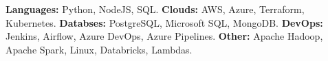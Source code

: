 

\textbf{Languages:} Python, NodeJS, SQL.
\textbf{Clouds:} AWS, Azure, Terraform, Kubernetes.
\textbf{Databses:} PostgreSQL, Microsoft SQL, MongoDB.
\textbf{DevOps:} Jenkins, Airflow, Azure DevOps, Azure Pipelines.
\textbf{Other:} Apache Hadoop, Apache Spark, Linux, Databricks, Lambdas.